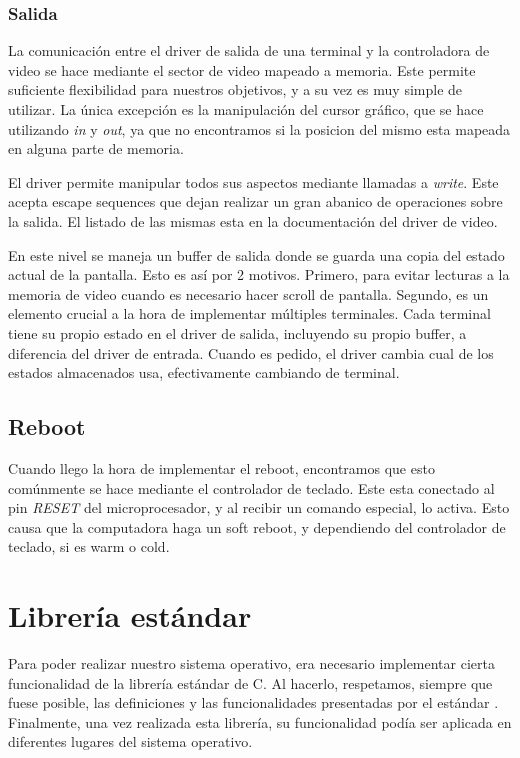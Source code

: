 \documentclass[a4paper,10pt]{article}
\begin{document}
        \subsubsection{Salida}
            La comunicación entre el driver de salida de una terminal y la controladora de video se hace mediante el sector de video mapeado a memoria.
            Este permite suficiente flexibilidad para nuestros objetivos, y a su vez es muy simple de utilizar.
            La única excepción es la manipulación del cursor gráfico, que se hace utilizando \textit{in} y \textit{out}, ya que no encontramos si la posicion del mismo esta mapeada en alguna parte de memoria.

            El driver permite manipular todos sus aspectos mediante llamadas a \textit{write}.
            Este acepta escape sequences que dejan realizar un gran abanico de operaciones sobre la salida.
            El listado de las mismas esta en la documentación del driver de video.
            
            En este nivel se maneja un buffer de salida donde se guarda una copia del estado actual de la pantalla.
            Esto es así por 2 motivos.
            Primero, para evitar lecturas a la memoria de video cuando es necesario hacer scroll de pantalla.
            Segundo, es un elemento crucial a la hora de implementar múltiples terminales.
            Cada terminal tiene su propio estado en el driver de salida, incluyendo su propio buffer, a diferencia del driver de entrada.
            Cuando es pedido, el driver cambia cual de los estados almacenados usa, efectivamente cambiando de terminal.

    \subsection{Reboot} 
        Cuando llego la hora de implementar el reboot, encontramos que esto comúnmente se hace mediante el controlador de teclado.
        Este esta conectado al pin \textit{RESET} del microprocesador, y al recibir un comando especial, lo activa.
        Esto causa que la computadora haga un soft reboot, y dependiendo del controlador de teclado, si es warm o cold.

\section{Librería estándar}
    Para poder realizar nuestro sistema operativo, era necesario implementar cierta funcionalidad de la librería estándar de C. Al hacerlo, respetamos, siempre que fuese posible, las definiciones y las funcionalidades presentadas por el estándar .
    Finalmente, una vez realizada esta librería, su funcionalidad podía ser aplicada en diferentes lugares del sistema operativo.
\end{document}
